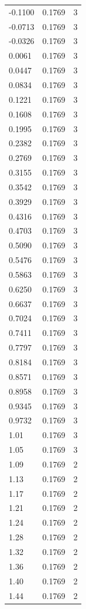 \begin{longtable}{lrr}
  -0.1100 & 0.1769 & 3 \\
  -0.0713 & 0.1769 & 3 \\
  -0.0326 & 0.1769 & 3 \\
  0.0061 & 0.1769 & 3 \\
  0.0447 & 0.1769 & 3 \\
  0.0834 & 0.1769 & 3 \\
  0.1221 & 0.1769 & 3 \\
  0.1608 & 0.1769 & 3 \\
  0.1995 & 0.1769 & 3 \\
  0.2382 & 0.1769 & 3 \\
  0.2769 & 0.1769 & 3 \\
  0.3155 & 0.1769 & 3 \\
  0.3542 & 0.1769 & 3 \\
  0.3929 & 0.1769 & 3 \\
  0.4316 & 0.1769 & 3 \\
  0.4703 & 0.1769 & 3 \\
  0.5090 & 0.1769 & 3 \\
  0.5476 & 0.1769 & 3 \\
  0.5863 & 0.1769 & 3 \\
  0.6250 & 0.1769 & 3 \\
  0.6637 & 0.1769 & 3 \\
  0.7024 & 0.1769 & 3 \\
  0.7411 & 0.1769 & 3 \\
  0.7797 & 0.1769 & 3 \\
  0.8184 & 0.1769 & 3 \\
  0.8571 & 0.1769 & 3 \\
  0.8958 & 0.1769 & 3 \\
  0.9345 & 0.1769 & 3 \\
  0.9732 & 0.1769 & 3 \\
  1.01 & 0.1769 & 3 \\
  1.05 & 0.1769 & 3 \\
  1.09 & 0.1769 & 2 \\
  1.13 & 0.1769 & 2 \\
  1.17 & 0.1769 & 2 \\
  1.21 & 0.1769 & 2 \\
  1.24 & 0.1769 & 2 \\
  1.28 & 0.1769 & 2 \\
  1.32 & 0.1769 & 2 \\
  1.36 & 0.1769 & 2 \\
  1.40 & 0.1769 & 2 \\
  1.44 & 0.1769 & 2 \\

\end{longtable}
